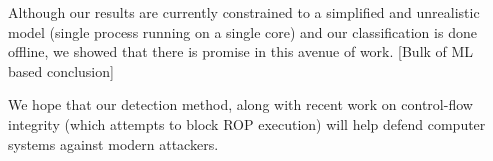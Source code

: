 \documentclass[letterpaper,twocolumn,10pt]{article}
\begin{document}
Although our results are currently constrained to a simplified and unrealistic model (single process running on a single core) and our classification is done offline, we showed that there is promise in this avenue of work. [Bulk of ML based conclusion]

We hope that our detection method, along with recent work on control-flow integrity (which attempts to block ROP execution) will help defend computer systems against modern attackers.

{\footnotesize 
}


\theendnotes
\end{document}
